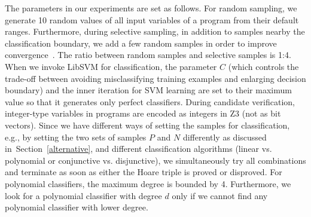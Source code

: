 The parameters in our experiments are set as follows. For random sampling, we generate 10 random values of all input variables of a program from their default ranges. Furthermore, during selective sampling, in addition to samples nearby the classification boundary, we add a few random samples in order to improve convergence~\cite{DBLP:conf/icml/SchohnC00}. The ratio between random samples and selective samples is 1:4. When we invoke LibSVM for classification, the parameter $C$ (which controls the trade-off between avoiding misclassifying training examples and enlarging decision boundary) and the inner iteration for SVM learning are set to their maximum value so that it generates only perfect classifiers. During candidate verification, integer-type variables in programs are encoded as integers in Z3 (not as bit vectors). Since we have different ways of setting the samples for classification, e.g., by setting the two sets of samples $P$ and $N$ differently as discussed in~Section~\ref{alternative}, and different classification algorithms (linear vs. polynomial or conjunctive vs. disjunctive), we simultaneously try all combinations and terminate as soon as either the Hoare triple is proved or disproved. For polynomial classifiers, the maximum degree is bounded by 4. Furthermore, we look for a polynomial classifier with degree $d$ only if we cannot find any polynomial classifier with lower degree. 

